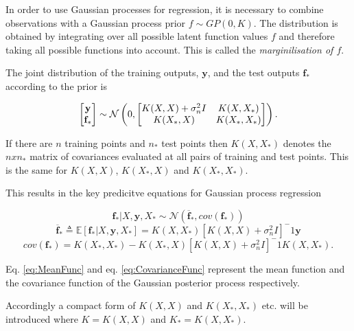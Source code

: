 \documentclass[12pt,a4paper]{report}
\theoremstyle{definition}
\begin{document}
In order to use Gaussian processes for regression, it is necessary to combine observations with a Gaussian process prior $f \sim GP(0, K)$. 
The distribution is obtained by integrating over all possible latent function values $f$ and therefore taking all possible functions into account. This is called the \emph{marginilisation of $f$}. 

The joint distribution of the training outputs, $\textbf{y}$, and the test outputs $\textbf{f}_{*}$ according to the prior is 

\begin{equation}
	\centering
	\begin{bmatrix}
		\textbf{y} \\
		\textbf{f}_{*}
	\end{bmatrix}
	\sim \mathcal{N} \left( 0,
	\begin{bmatrix}
		K(X, X) + \sigma_{n}^2I & K(X, X_{*}) \\
		K(X_{*},  X) & K(X_{*},  X_{*})
	\end{bmatrix} \right) .
	\label{eq:JointPriorDist}
\end{equation}

If there are $n$ training points and $n_{*}$ test points then $K(X, X_{*})$ denotes the $n x n_{*}$ matrix of covariances evaluated at all pairs of training and test points. 
This is the same for $K(X, X)$, $K(X_{*},  X)$ and $K(X_{*},  X_{*})$.

This results in the key predicitve equations for Gaussian process regression

\begin{equation}
	\textbf{f}_{*} | X, \textbf{y}, X_{*} \sim \mathcal{N}(\overline{\textbf{f}}_{*}, cov(\textbf{f}_{*}))
\end{equation}
\begin{equation}
	\overline{\textbf{f}}_{*} \triangleq \mathbb{E}[\textbf{f}_{*} | X, \textbf{y}, X_{*}] = K(X, X_{*})[K(X, X) +  \sigma_{n}^2I]^-1 \textbf{y}
	\label{eq:MeanFunc}
\end{equation}
\begin{equation}
	cov(\textbf{f}_{*}) = K(X_{*}, X_{*}) - K(X_{*}, X)[K(X, X) +  \sigma_{n}^2I]^-1 K(X, X_{*}).
	\label{eq:CovarianceFunc}
\end{equation}

Eq. \ref{eq:MeanFunc} and eq. \ref{eq:CovarianceFunc} represent the mean function and the covariance function of the Gaussian posterior process respectively. 

Accordingly a compact form of $K(X, X)$ and $K(X_{*}, X_{*})$ etc. will be introduced where $K = K(X, X)$ and $K_{*} = K(X, X_{*})$.
\end{document}
